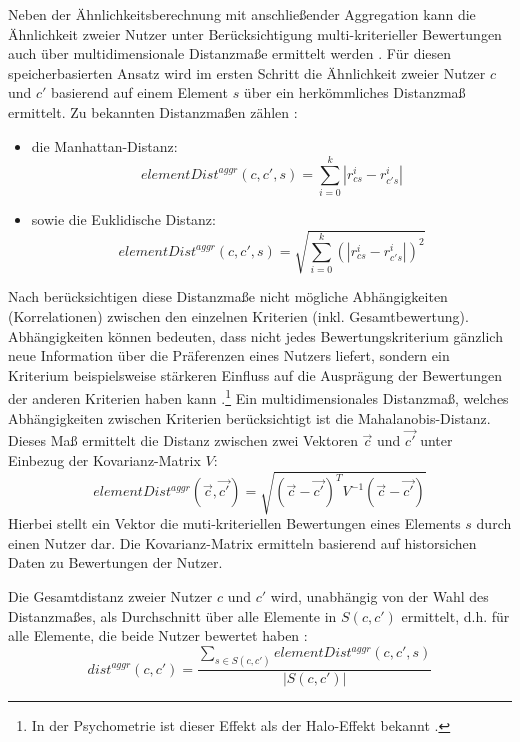 Neben der Ähnlichkeitsberechnung mit anschließender Aggregation kann die Ähnlichkeit zweier Nutzer unter Berücksichtigung multi-kriterieller Bewertungen auch über multidimensionale Distanzmaße ermittelt werden \cite[S. 857]{adomavicius:4:inbook}.
Für diesen speicherbasierten Ansatz wird im ersten Schritt die Ähnlichkeit zweier Nutzer $c$ und $c'$ basierend auf einem Element $s$ über ein herkömmliches Distanzmaß ermittelt.
Zu bekannten Distanzmaßen zählen \textcite[S. 857f.]{adomavicius:4:inbook}:
\begin{itemize}
    \item die Manhattan-Distanz:
    \begin{equation}\label{eq18}
        elementDist^{aggr}(c,c',s)= \sum\limits_{i=0}^{k}|r_{cs}^{i}-r_{c's}^{i}|
    \end{equation}
    \item sowie die Euklidische Distanz:
    \begin{equation}\label{eq19}
        elementDist^{aggr}(c,c',s)= \sqrt{\sum\limits_{i=0}^{k}(|r_{cs}^{i}-r_{c's}^{i}|)^{2}}
    \end{equation}
\end{itemize}

Nach \textcite[S. 240]{sahoo:article} berücksichtigen diese Distanzmaße nicht mögliche Abhängigkeiten (Korrelationen) zwischen den einzelnen Kriterien (inkl. Gesamtbewertung).
Abhängigkeiten können bedeuten, dass nicht jedes Bewertungskriterium gänzlich neue Information über die Präferenzen eines Nutzers liefert, sondern ein Kriterium beispielsweise stärkeren Einfluss auf die Ausprägung der Bewertungen der anderen Kriterien haben kann \cite[S. 235]{sahoo:article}.\footnote{In der Psychometrie ist dieser Effekt als der Halo-Effekt bekannt \cite[S. 3]{sahoo:2:article}.}
Ein multidimensionales Distanzmaß, welches Abhängigkeiten zwischen Kriterien berücksichtigt ist die Mahalanobis-Distanz.
Dieses Maß ermittelt die Distanz zwischen zwei Vektoren $\vec{c}$ und $\vec{c'}$ unter Einbezug der Kovarianz-Matrix $V$:
\begin{equation}\label{eq25}
    elementDist^{aggr}(\vec{c},\vec{c'}) = \sqrt{(\vec{c}-\vec{c'})^{T}V^{-1}(\vec{c}-\vec{c'})}
\end{equation}
Hierbei stellt ein Vektor die muti-kriteriellen Bewertungen eines Elements $s$ durch einen Nutzer dar.
Die Kovarianz-Matrix ermitteln \textcite[S. 240]{sahoo:article} basierend auf historsichen Daten zu Bewertungen der Nutzer.

Die Gesamtdistanz zweier Nutzer $c$ und $c'$ wird, unabhängig von der Wahl des Distanzmaßes, als Durchschnitt über alle Elemente in $S(c,c')$ ermittelt, d.h. für alle Elemente, die beide Nutzer bewertet haben \cite[S. 858]{adomavicius:4:inbook}:
\begin{equation}\label{eq20}
    dist^{aggr}(c,c')= \frac{\sum\limits_{s \in S(c,c')}elementDist^{aggr}(c,c',s)}{|S(c,c')|}
\end{equation}

